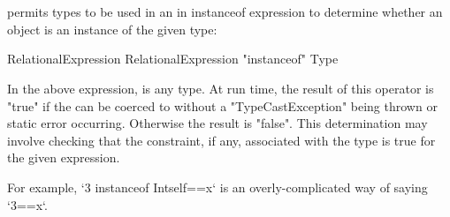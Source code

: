 






\section{}
\label{instanceOf}

\Xten{} permits types to be used in an in instanceof expression
to determine whether an object is an instance of the given type:

\begin{grammar}
RelationalExpression \: RelationalExpression \xcd"instanceof" Type
\end{grammar}

In the above expression,  is any type. At run time, the
result of this operator is \xcd"true" if the
 can be coerced to 
without a \xcd"TypeCastException" being thrown or static error occurring.
Otherwise the result is \xcd"false". This determination may involve checking
that the constraint, if any, associated with the type is true for the given
expression.

For example, \xcd`3 instanceof Int{self==x}` is an overly-complicated way of
saying \xcd`3==x`.

